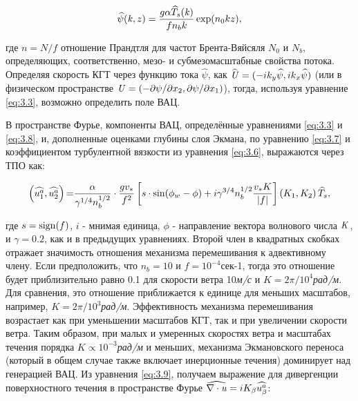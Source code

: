 \begin{equation} \label{eq:3.8} \widehat{\psi }({\it k},z)=\frac{g\alpha \widehat{T}_{s} ({\it k})}{fn_{b} k} \exp (n_{0} kz),  \end{equation} 



\noindent где $n=N/f$ отношение Прандтля для частот Брента-Вяйсяля $N_{0} $ и $N_{b} $, определяющих, соответственно, мезо- и субмезомасштабные свойства потока. Определяя скорость КГТ через функцию тока $\widehat{\psi }$, как $\widehat{{\it U}}=(-ik_{y} \widehat{\psi },ik_{x} \widehat{\psi })$ (или в физическом пространстве ${\it U}=(-\partial \psi /\partial x_{2} ,\partial \psi /\partial x_{1} )$), тогда, используя уравнение \eqref{eq:3.3}, возможно определить поле ВАЦ. 

В пространстве Фурье, компоненты ВАЦ, определённые уравнениями \eqref{eq:3.3} и \eqref{eq:3.8}, и, дополненные оценками глубины слоя Экмана, по уравнению \eqref{eq:3.7} и коэффициентом турбулентной вязкости из уравнения \eqref{eq:3.6}, выражаются через ТПО как:



\begin{equation} \label{eq:3.9} \left(\widehat{u_{1}^{a} },\widehat{u_{2}^{a} }\right){\rm =}\frac{\alpha }{\gamma ^{1/4} n_{b}^{1/2} } \cdot \frac{gv_{*} }{f^{2} } \left[s\cdot \sin (\phi _{w} -\phi )+i\gamma ^{3/4} n_{b}^{1/2} \frac{v_{*} K}{\left|f\right|} \right]\left(K_{1} ,K_{2} \right)\widehat{T}_{s} ,  \end{equation} 



\noindent где $s={\rm sign}(f)$, $i$ - мнимая единица, $\phi $ - направление вектора волнового числа ${\it K}$, и $\gamma =0.2$, как и в предыдущих уравнениях. Второй член в квадратных скобках отражает значимость отношения механизма перемешивания к адвективному члену. Если предположить, что $n_{b} =10$ и $f=10^{-4} $сек-1, тогда это отношение будет приблизительно равно 0.1 для скорости ветра 10\textit{м/с} и $K=2\pi /10^{4} $\textit{рад/м}. Для сравнения, это отношение приближается к единице для меньших масштабов, например, $K=2\pi /10^{3} $\textit{рад/м}. Эффективность механизма перемешивания возрастает как при уменьшении масштабов КГТ, так и при увеличении скорости ветра. Таким образом, при малых и умеренных скоростях ветра и масштабах течения порядка $K\propto 10^{-3} $\textit{рад/м} и меньших, механизма Экмановского переноса (который в общем случае также включает инерционные течения) доминирует над генерацией ВАЦ. Из уравнения \eqref{eq:3.9}, получаем выражение для дивергенции поверхностного течения в пространстве Фурье $\widehat{\nabla \cdot {\it u}}=iK_{\beta } \widehat{u_{\beta }^{a} }$:



